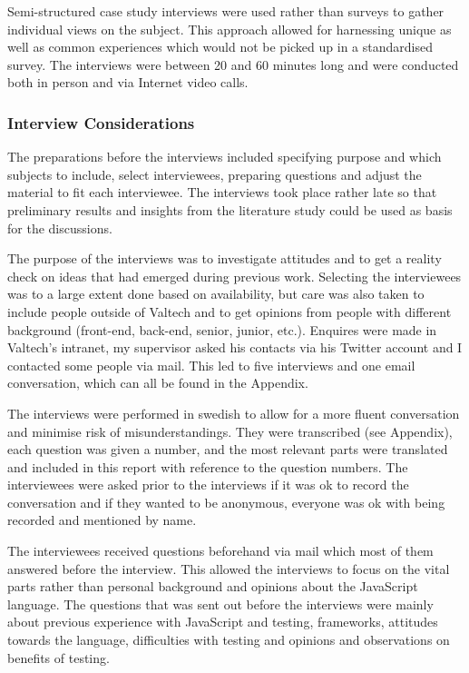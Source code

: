 \documentclass[11pt]{article}
\begin{document}
Semi-structured case study interviews were used rather than surveys to gather individual views on the subject. This approach allowed for harnessing unique as well as common experiences which would not be picked up in a standardised survey. The interviews were between 20 and 60 minutes long and were conducted both in person and via Internet video calls.

\subsubsection{Interview Considerations}

The preparations before the interviews included specifying purpose and which subjects to include, select interviewees, preparing questions and adjust the material to fit each interviewee. The interviews took place rather late so that preliminary results and insights from the literature study could be used as basis for the discussions.

The purpose of the interviews was to investigate attitudes and to get a reality check on ideas that had emerged during previous work. Selecting the interviewees was to a large extent done based on availability, but care was also taken to include people outside of Valtech and to get opinions from people with different background (front-end, back-end, senior, junior, etc.). Enquires were made in Valtech's intranet, my supervisor asked his contacts via his Twitter account and I contacted some people via mail. This led to five interviews and one email conversation, which can all be found in the Appendix.

The interviews were performed in swedish to allow for a more fluent conversation and minimise risk of misunderstandings. They were transcribed (see Appendix), each question was given a number, and the most relevant parts were translated and included in this report with reference to the question numbers. The interviewees were asked prior to the interviews if it was ok to record the conversation and if they wanted to be anonymous, everyone was ok with being recorded and mentioned by name.

The interviewees received questions beforehand via mail which most of them answered before the interview. This allowed the interviews to focus on the vital parts rather than personal background and opinions about the JavaScript language. The questions that was sent out before the interviews were mainly about previous experience with JavaScript and testing, frameworks, attitudes towards the language, difficulties with testing and opinions and observations on benefits of testing.
\end{document}
